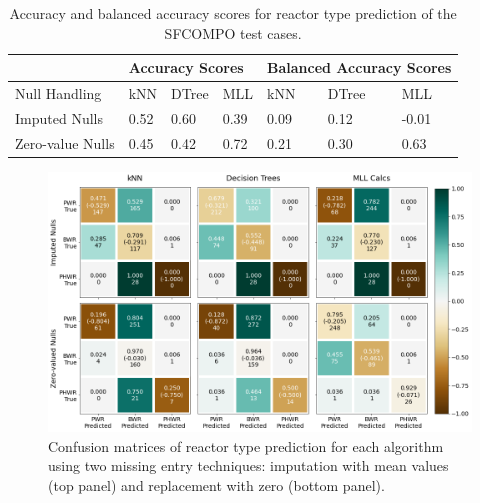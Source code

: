 \begin{table}[!htb]
  \centering
  \begin{tabular}{@{}m{1.5in}llllll@{}}
    \toprule
    & \multicolumn{3}{m{2in}}{Accuracy Scores} 
    & \multicolumn{3}{l}{Balanced Accuracy Scores} \\ 
    \toprule
    Null Handling    & kNN   & DTree  & MLL   & kNN   & DTree  & MLL    \\ \midrule
    Imputed Nulls    & 0.52  & 0.60   & 0.39  & 0.09  & 0.12   & -0.01  \\
    Zero-value Nulls & 0.45  & 0.42   & 0.72  & 0.21  & 0.30   & 0.63   \\ \bottomrule
    \end{tabular}
  \caption[Performance of reactor type classification of \acrshort{SFCOMPO} 
           entries]
          {Accuracy and balanced accuracy scores for reactor type prediction 
           of the \acrshort{SFCOMPO} test cases.}
  \label{tbl:sfcorxtr}
\end{table}

\begin{figure}[!htb]
  \centering
  \includegraphics[width=\textwidth]{./chapters/exp1/confusion_matrix_sfco.png}
  \caption[Confusion matrices of reactor type classification of 
           \acrshort{SFCOMPO} entries]
          {Confusion matrices of reactor type prediction for each algorithm 
           using two missing entry techniques: imputation with mean values (top 
           panel) and replacement with zero (bottom panel).}
  \label{fig:cm}
\end{figure}

